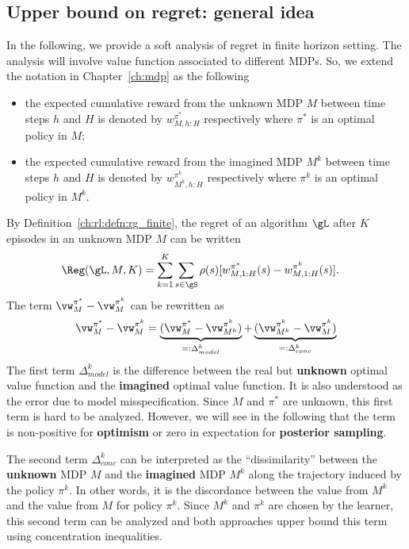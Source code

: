 \subsection{Upper bound on regret: general idea}

In the following, we provide a soft analysis of regret in finite horizon setting. 
The analysis will involve value function associated to different MDPs.
So, we extend the notation in Chapter~\ref{ch:mdp} as the following
\begin{itemize}
    \item the expected cumulative reward from the unknown MDP $M$ between time steps $h$ and $H$ is denoted by $w^{\pi^*}_{M,h:H}$ respectively where $\pi^*$ is an optimal policy in $M$;
    \item the expected cumulative reward from the imagined MDP $M^k$ between time steps $h$ and $H$ is denoted by $w^{\pi^k}_{M^k,h:H}$ respectively where $\pi^k$ is an optimal policy in $M^k$.
\end{itemize}

By Definition~\ref{ch:rl:defn:rg_finite}, the regret of an algorithm $\gL$ after $K$ episodes in an unknown MDP $M$ can be written
\begin{align*}
    \Reg(\gL, M, K) &= \sum_{k=1}^K\sum_{s\in\gS}\rho(s)[w^{\pi^*}_{M,1:H}(s) -w^{\pi^k}_{M,1:H}(s)].
\end{align*}
The term $\vw^{\pi^*}_M -\vw^{\pi^k}_M$ can be rewritten as
\begin{equation}
    \label{eq:rg_model_conc}
    \vw^{\pi^*}_M -\vw^{\pi^k}_M = \underbrace{(\vw^{\pi^*}_M -\vw^{\pi^k}_{M^k})}_{=:\Delta_{model}^k} +\underbrace{(\vw^{\pi^k}_{M^k} -\vw^{\pi^k}_M)}_{=:\Delta_{conc}^k}
\end{equation}
The first term $\Delta_{model}^k$ is the difference between the real but \textbf{unknown} optimal value function and the \textbf{imagined} optimal value function.
It is also understood as the error due to model misspecification.
Since $M$ and $\pi^*$ are unknown, this first term is hard to be analyzed.
However, we will see in the following that the term is non-positive for \textbf{optimism} or zero in expectation for \textbf{posterior sampling}.

The second term $\Delta_{conc}^k$ can be interpreted as the ``dissimilarity'' between the \textbf{unknown} MDP $M$ and the \textbf{imagined} MDP $M^k$ along the trajectory induced by the policy $\pi^k$.
In other words, it is the discordance between the value from $M^k$ and the value from $M$ for policy $\pi^k$.
Since $M^k$ and $\pi^k$ are chosen by the learner, this second term can be analyzed and both approaches upper bound this term using concentration inequalities.

